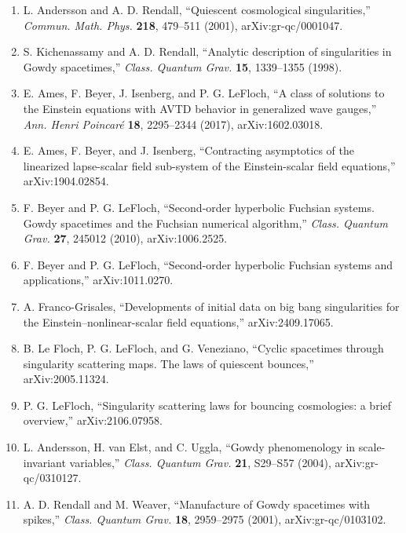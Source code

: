 \begin{enumerate}
\item L. Andersson and A. D. Rendall, ``Quiescent cosmological singularities,''
\emph{Commun. Math. Phys.} \textbf{218}, 479--511 (2001), arXiv:gr-qc/0001047.

\item S. Kichenassamy and A. D. Rendall, ``Analytic description of singularities
in Gowdy spacetimes,'' \emph{Class. Quantum Grav.} \textbf{15}, 1339--1355 (1998).

\item E. Ames, F. Beyer, J. Isenberg, and P. G. LeFloch, ``A class of solutions to
the Einstein equations with AVTD behavior in generalized wave gauges,'' \emph{Ann. Henri Poincar\'e} \textbf{18}, 2295--2344 (2017), arXiv:1602.03018.

\item E. Ames, F. Beyer, and J. Isenberg, ``Contracting asymptotics of the
linearized lapse-scalar field sub-system of the Einstein-scalar field equations,'' arXiv:1904.02854.

\item F. Beyer and P. G. LeFloch, ``Second-order hyperbolic Fuchsian systems.
Gowdy spacetimes and the Fuchsian numerical algorithm,'' \emph{Class. Quantum Grav.} \textbf{27}, 245012 (2010), arXiv:1006.2525.

\item F. Beyer and P. G. LeFloch, ``Second-order hyperbolic Fuchsian systems and
applications,'' arXiv:1011.0270.

\item A. Franco-Grisales, ``Developments of initial data on big bang singularities
for the Einstein--nonlinear-scalar field equations,'' arXiv:2409.17065.

\item B. Le Floch, P. G. LeFloch, and G. Veneziano, ``Cyclic spacetimes through
singularity scattering maps. The laws of quiescent bounces,'' arXiv:2005.11324.

\item P. G. LeFloch, ``Singularity scattering laws for bouncing cosmologies: a
brief overview,'' arXiv:2106.07958.

\item L. Andersson, H. van Elst, and C. Uggla, ``Gowdy phenomenology in
scale-invariant variables,'' \emph{Class. Quantum Grav.} \textbf{21}, S29--S57 (2004), arXiv:gr-qc/0310127.

\item A. D. Rendall and M. Weaver, ``Manufacture of Gowdy spacetimes with
spikes,'' \emph{Class. Quantum Grav.} \textbf{18}, 2959--2975 (2001), arXiv:gr-qc/0103102.


\end{enumerate}
